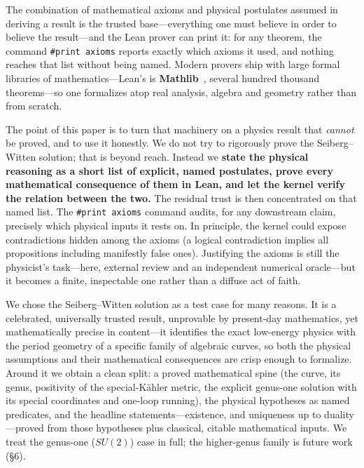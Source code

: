 \documentclass{article}
\theoremstyle{plain}
\theoremstyle{definition}
\numberwithin{equation}{section}
\newcommand{\code}[1]{\texttt{#1}}
\begin{document}
The combination of mathematical axioms and physical postulates 
assumed in deriving a result is the {trusted base}---everything one must believe in
order to believe the result---and the Lean prover can print it: for any theorem, the command
\code{\#print axioms} reports exactly which axioms it used, and nothing reaches that list without
being named. Modern provers ship with large formal libraries of mathematics---Lean's is
\textbf{Mathlib}~\cite{mathlib}, several hundred thousand theorems---so one formalizes atop real
analysis, algebra and geometry rather than from scratch.

The point of this paper is to turn that machinery on a physics result that \emph{cannot} be proved,
and to use it honestly. We do not try to rigorously prove the Seiberg--Witten solution; that is beyond reach.
Instead we \textbf{state the physical reasoning as a short list of explicit, named postulates, prove
every mathematical consequence of them in Lean, and let the kernel verify the relation between the two.}
The residual trust is then concentrated on that named list.  
The \code{\#print axioms} command audits, for any downstream claim, precisely which
physical inputs it rests on. 
In principle, the kernel could expose contradictions
hidden among the axioms (a logical contradiction implies all propositions including manifestly false ones).
Justifying the axioms is still the physicist's task---here, external
review and an independent numerical oracle---but it becomes a finite, inspectable one rather than a
diffuse act of faith.

We chose the {Seiberg--Witten solution} as a test case for many
reasons.  It is a
celebrated, universally trusted result, unprovable by present-day mathematics, yet mathematically precise
in content---it identifies the exact low-energy physics with the period geometry of a specific family
of algebraic curves, so both the physical assumptions and their mathematical consequences are crisp
enough to formalize. Around it we obtain a clean split: a proved mathematical spine (the curve, its
genus, positivity of the special-K\"ahler metric, the explicit genus-one solution with its
special coordinates and one-loop running), the physical hypotheses as named predicates, and the
headline statements---existence, and uniqueness up to duality---proved from those hypotheses
plus classical, citable mathematical inputs. We treat the genus-one ($SU(2)$) case in full;
the higher-genus family is future work (\S6).
\end{document}
